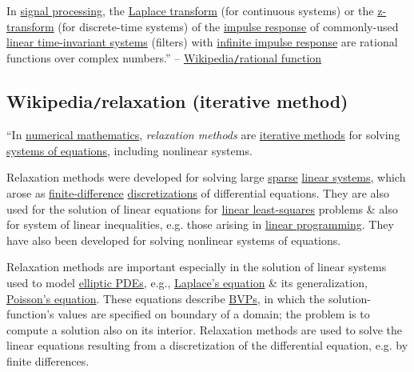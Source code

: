 \documentclass{article}
\begin{document}
In \href{https://en.wikipedia.org/wiki/Signal_processing}{signal processing}, the \href{https://en.wikipedia.org/wiki/Laplace_transform}{Laplace transform} (for continuous systems) or the \href{https://en.wikipedia.org/wiki/Z-transform}{z-transform} (for discrete-time systems) of the \href{https://en.wikipedia.org/wiki/Impulse_response}{impulse response} of commonly-used \href{https://en.wikipedia.org/wiki/Linear_time-invariant_system}{linear time-invariant systems} (filters) with \href{https://en.wikipedia.org/wiki/Infinite_impulse_response}{infinite impulse response} are rational functions over complex numbers.'' -- \href{https://en.wikipedia.org/wiki/Rational_function}{Wikipedia{\tt/}rational function}


\subsection{Wikipedia{\tt/}relaxation (iterative method)}
``In \href{https://en.wikipedia.org/wiki/Numerical_mathematics}{numerical mathematics}, {\it relaxation methods} are \href{https://en.wikipedia.org/wiki/Iterative_method}{iterative methods} for solving \href{https://en.wikipedia.org/wiki/Simultaneous_equations}{systems of equations}, including nonlinear systems.

Relaxation methods were developed for solving large \href{https://en.wikipedia.org/wiki/Sparse_matrix}{sparse} \href{https://en.wikipedia.org/wiki/Linear_system}{linear systems}, which arose as \href{https://en.wikipedia.org/wiki/Finite_difference}{finite-difference} \href{https://en.wikipedia.org/wiki/Discretization}{discretizations} of differential equations. They are also used for the solution of linear equations for \href{https://en.wikipedia.org/wiki/Linear_least_squares_(mathematics)}{linear least-squares} problems \& also for system of linear inequalities, e.g. those arising in \href{https://en.wikipedia.org/wiki/Linear_programming}{linear programming}. They have also been developed for solving nonlinear systems of equations.

Relaxation methods are important especially in the solution of linear systems used to model \href{https://en.wikipedia.org/wiki/Elliptic_partial_differential_equation}{elliptic PDEs}, e.g., \href{https://en.wikipedia.org/wiki/Laplace%27s_equation}{Laplace's equation} \& its generalization, \href{https://en.wikipedia.org/wiki/Poisson%27s_equation}{Poisson's equation}. These equations describe \href{https://en.wikipedia.org/wiki/Boundary-value_problem}{BVPs}, in which the solution-function's values are specified on boundary of a domain; the problem is to compute a solution also on its interior. Relaxation methods are used to solve the linear equations resulting from a discretization of the differential equation, e.g. by finite differences.
\end{document}
